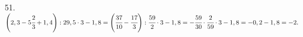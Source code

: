 51. $\left(2,3-5\cfrac{2}{3}+1,4\right):29,5\cdot3-1,8=
\left(\cfrac{37}{10}-\cfrac{17}{3}\right):\cfrac{59}{2}\cdot3-1,8=
-\cfrac{59}{30}\cdot\cfrac{2}{59}\cdot3-1,8=-0,2-1,8=-2.$\\
